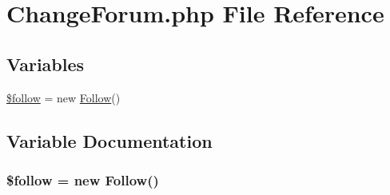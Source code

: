 \hypertarget{_change_forum_8php}{}\section{Change\+Forum.\+php File Reference}
\label{_change_forum_8php}
\subsection*{Variables}
\begin{DoxyCompactItemize}
\item 
\hyperlink{_change_forum_8php_ab5929d3bc848873a208b38b88e7b226c}{\$follow} = new \hyperlink{class_follow}{Follow}()
\end{DoxyCompactItemize}


\subsection{Variable Documentation}
\subsubsection[{\texorpdfstring{\$follow}{$follow}}]{\setlength{\rightskip}{0pt plus 5cm}\$follow = new {\bf Follow}()}\hypertarget{_change_forum_8php_ab5929d3bc848873a208b38b88e7b226c}{}\label{_change_forum_8php_ab5929d3bc848873a208b38b88e7b226c}
